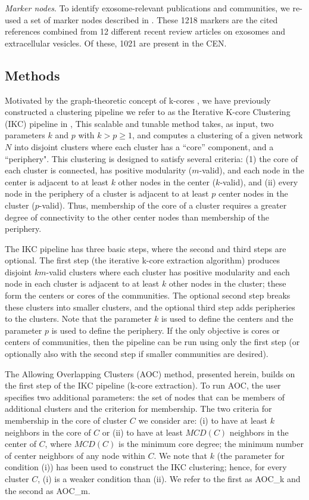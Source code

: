 \documentclass[12pt, oneside]{article}   	%
\begin{document}
\emph{Marker nodes}. To identify exosome-relevant publications and communities, we re-used a set of marker nodes described in  \citep{Wedell2022}. These 1218 markers are the cited references combined from 12 different recent review articles on exosomes and extracellular vesicles. Of these, 1021 are present in the CEN. 

\subsection{Methods} Motivated by the graph-theoretic concept of k-cores \citep{Giatsidis2011,malliaros2019}, we have previously constructed a clustering pipeline we refer to as  the Iterative K-core Clustering (IKC) pipeline in \cite{Wedell2022}, This scalable and tunable method takes, as input, two parameters $k$ and $p$ with $k > p \geq 1$, and computes a clustering of a given network $N$ into disjoint clusters where each cluster has a ``core'' component, and a ``periphery". This clustering is designed to satisfy several criteria: (1) the core of each cluster is connected,  has positive modularity ($m$-valid), and each node in the center  is adjacent to at least $k$ other nodes in the center ($k$-valid), and (ii) every node in the periphery of a cluster is adjacent to at least $p$ center nodes in the cluster ($p$-valid). Thus, membership of the core of a cluster requires a greater degree of connectivity to the other center nodes than membership of the periphery. 

The IKC pipeline has three basic steps, where the second and third steps are optional.  The first step (the iterative k-core extraction algorithm) produces disjoint $km$-valid clusters where each cluster has positive modularity and each node in each cluster is adjacent to at least $k$ other nodes in the cluster; these form the centers or cores of the communities. The optional second step breaks these clusters into smaller clusters, and the optional third step adds peripheries to the clusters.  Note that the parameter $k$ is used to define the centers and the parameter $p$ is used to define the periphery. If the only objective is cores or centers of communities, then the pipeline can be run using only the first step (or optionally also with the second step if smaller communities are desired).

The Allowing Overlapping Clusters (AOC) method, presented herein, builds on the first step of the IKC pipeline (k-core extraction). To run AOC, the user specifies two additional parameters:  
the set of nodes that can be members of  additional clusters and the criterion for membership.  The two criteria for membership in the core of cluster $C$ we consider are: (i) to have at least $k$ neighbors 
in the core of $C$ or (ii) to have at least $MCD(C)$ neighbors in the center of $C$, where $MCD(C)$ is the minimum core degree; the minimum number of center neighbors of any node within $C$. 
We note that $k$ (the parameter for condition (i)) has been used to construct the IKC clustering; hence, for every cluster $C$,  (i) is a weaker condition than (ii).
We refer to the first as AOC\_k and the second as AOC\_m.
\end{document}
